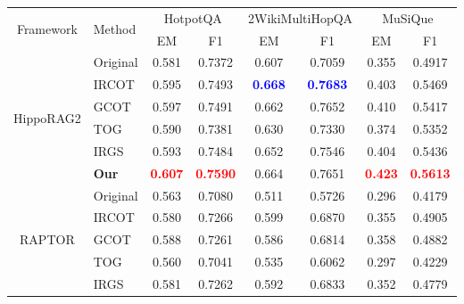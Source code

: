\documentclass{article} %
\begin{document}


\begin{table}[t]
\centering
\setlength{\tabcolsep}{6pt}
\renewcommand{\arraystretch}{1.2}
\begin{tabular}{clcccccc}
\toprule
\multirow{2}{*}{Framework} & \multirow{2}{*}{Method} 
& \multicolumn{2}{c}{HotpotQA} 
& \multicolumn{2}{c}{2WikiMultiHopQA} 
& \multicolumn{2}{c}{MuSiQue} \\
\cmidrule(lr){3-4} \cmidrule(lr){5-6} \cmidrule(lr){7-8}
& & EM & F1 & EM & F1 & EM & F1 \\
\midrule
\multirow{6}{*}{HippoRAG2} 
& Original & 0.581 & 0.7372 & 0.607 & 0.7059 & 0.355 & 0.4917 \\
& IRCOT    & 0.595 & 0.7493 & \textcolor{blue}{\textbf{0.668}} & \textcolor{blue}{\textbf{0.7683}} & 0.403 & 0.5469 \\
& GCOT     & 0.597 & 0.7491 & 0.662 & 0.7652 & 0.410 & 0.5417 \\
& TOG      & 0.590 & 0.7381 & 0.630 & 0.7330 & 0.374 & 0.5352 \\
& IRGS     & 0.593 & 0.7484 & 0.652 & 0.7546 & 0.404 & 0.5436 \\
& \textbf{Our} & \textcolor{red}{\textbf{0.607}} & \textcolor{red}{\textbf{0.7590}} & 0.664 & 0.7651 & \textcolor{red}{\textbf{0.423}} & \textcolor{red}{\textbf{0.5613}} \\
\midrule
\multirow{6}{*}{RAPTOR} 
& Original & 0.563 & 0.7080 & 0.511 & 0.5726 & 0.296 & 0.4179 \\
& IRCOT    & 0.580 & 0.7266 & 0.599 & 0.6870 & 0.355 & 0.4905 \\
& GCOT     & 0.588 & 0.7261 & 0.586 & 0.6814 & 0.358 & 0.4882 \\
& TOG      & 0.560 & 0.7041 & 0.535 & 0.6062 & 0.297 & 0.4229 \\
& IRGS     & 0.581 & 0.7262 & 0.592 & 0.6833 & 0.352 & 0.4779 \\

\end{tabular}
\end{table}
\end{document}

